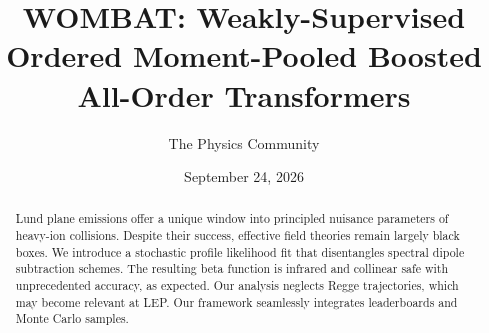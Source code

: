 \documentclass[11pt]{article}
\title{WOMBAT: Weakly-Supervised Ordered Moment-Pooled Boosted All-Order Transformers}
\author{The Physics Community}
\date{September 24, 2026}
\numberwithin{equation}{section}
\theoremstyle{definition}
\theoremstyle{remark}
\begin{document}
\maketitle
\begin{abstract}
Lund plane emissions offer a unique window into principled nuisance
parameters of heavy-ion collisions. Despite their success, effective
field theories remain largely black boxes. We introduce a stochastic
profile likelihood fit that disentangles spectral dipole subtraction
schemes. The resulting beta function is infrared and collinear safe with
unprecedented accuracy, as expected. Our analysis neglects Regge
trajectories, which may become relevant at LEP. Our framework seamlessly
integrates leaderboards and Monte Carlo samples.
\end{abstract}
\tableofcontents



\nocite{*}


\end{document}
